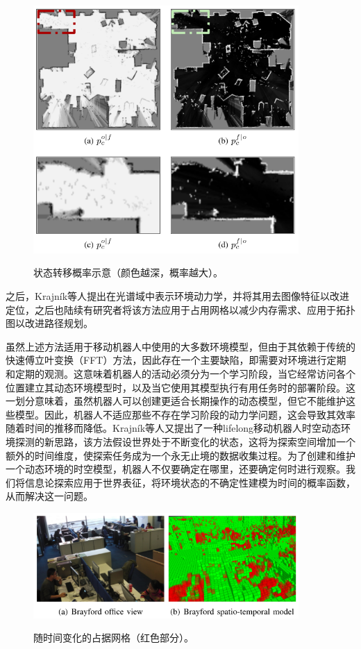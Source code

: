\begin{figure}[htbp]
	\centering
	\includegraphics[width=0.9\textwidth]{figs/2-3/filter.png}
	\label{fig:State transition probabilities}
	\caption{状态转移概率示意（颜色越深，概率越大）。}
\end{figure}

之后，Krajník等人\cite{Krajn2014Spectral}提出在光谱域中表示环境动力学，并将其用去图像特征以改进定位，之后也陆续有研究者将该方法应用于占用网格以减少内存需求、应用于拓扑图以改进路径规划。

虽然上述方法适用于移动机器人中使用的大多数环境模型，但由于其依赖于传统的快速傅立叶变换（FFT）方法，因此存在一个主要缺陷，即需要对环境进行定期和定期的观测。这意味着机器人的活动必须分为一个学习阶段，当它经常访问各个位置建立其动态环境模型时，以及当它使用其模型执行有用任务时的部署阶段。这一划分意味着，虽然机器人可以创建更适合长期操作的动态模型，但它不能维护这些模型。因此，机器人不适应那些不存在学习阶段的动力学问题，这会导致其效率随着时间的推移而降低。Krajník等人\cite{Krajnik2015Life}又提出了一种lifelong移动机器人时空动态环境探测的新思路，该方法假设世界处于不断变化的状态，这将为探索空间增加一个额外的时间维度，使探索任务成为一个永无止境的数据收集过程。为了创建和维护一个动态环境的时空模型，机器人不仅要确定在哪里，还要确定何时进行观察。我们将信息论探索应用于世界表征，将环境状态的不确定性建模为时间的概率函数，从而解决这一问题。

\begin{figure}[htbp]
	\centering
	\includegraphics[width=0.9\textwidth]{figs/2-3/lifelong.png}
	\label{fig:Spatio-temporal occupancy grid}
	\caption{随时间变化的占据网格（红色部分）。}
\end{figure}

